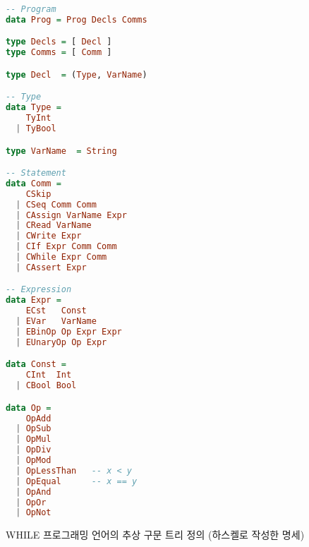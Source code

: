 \documentclass[a4paper]{book}
\begin{document}
\begin{figure}[h]
{\footnotesize
\begin{center}
\begin{minipage}[h]{.6\textwidth}
\begin{lstlisting}[language=Haskell]
-- Program
data Prog = Prog Decls Comms

type Decls = [ Decl ]
type Comms = [ Comm ]

type Decl  = (Type, VarName)

-- Type
data Type =
    TyInt
  | TyBool

type VarName  = String

-- Statement
data Comm =
    CSkip
  | CSeq Comm Comm
  | CAssign VarName Expr
  | CRead VarName
  | CWrite Expr
  | CIf Expr Comm Comm
  | CWhile Expr Comm
  | CAssert Expr

-- Expression
data Expr =
    ECst   Const
  | EVar   VarName
  | EBinOp Op Expr Expr
  | EUnaryOp Op Expr

data Const =
    CInt  Int
  | CBool Bool

data Op =
    OpAdd
  | OpSub
  | OpMul
  | OpDiv
  | OpMod
  | OpLessThan   -- x < y
  | OpEqual      -- x == y
  | OpAnd
  | OpOr
  | OpNot
\end{lstlisting}
\end{minipage}
\end{center}
}
\caption{WHILE 프로그래밍 언어의 추상 구문 트리 정의 (하스켈로 작성한 명세)}
\label{fig:haskellastdatatype}
\end{figure}




\end{document}
